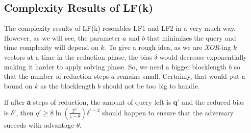 \documentclass{article}
\begin{document}
  \subsection[3.1]{Complexity Results of LF(k)}
  The complexity results of LF(k) resembles LF1 and LF2 in a very much way. However, as we will see, the parameter $a$ and $b$ that minimizes the query and time complexity will depend on $k$. To give a rough idea, as we are \emph{XOR}-ing $k$ vectors at a time in the reduction phase, the bias $\delta$ would decrease exponentially making it harder to apply solving phase. So, we need a bigger blocklength $b$ so that the number of reduction steps $a$ remains small. Certainly, that would put a bound on $k$ as the blocklength $b$ should not be too big to handle.
  \begin{lemma}
  	If after \textbf{a} steps of reduction, the amount of query left is $\mathbf{q'}$ and the reduced bias is $\delta'$, then $q'\ge 8\ln(\frac{2^{n'}}{1-\theta})\delta^{'-2}$ should happen to ensure that the adversary suceeds with advantage $\theta$.
  \end{lemma}
  
\end{document}
